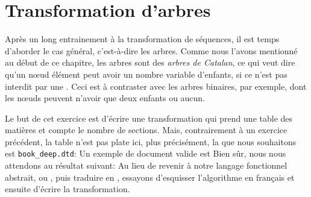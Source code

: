 \section{Transformation d'arbres}

Après un long entrainement à la transformation de séquences, il est
temps d'aborder le cas général, c'est-à-dire les arbres. Comme nous
l'avons mentionné au début de ce chapitre, les arbres \XML sont des
\emph{arbres de Catalan}, ce qui veut dire qu'un n{\oe}ud élément peut
avoir un nombre variable d'enfants, si ce n'est pas interdit par une
\DTD. Ceci est à contraster avec les arbres binaires, par exemple,
dont les n{\oe}uds peuvent n'avoir que deux enfants ou aucun.


Le but de cet exercice est d'écrire une transformation \XSLT qui prend
une table des matières et compte le nombre de sections. Mais,
contrairement à un exercice précédent, la table n'est pas plate ici,
plus précisément, la \DTD que nous souhaitons est \texttt{book\_deep.dtd}:
\noindent Un exemple de document \XML valide est
\noindent Bien sûr, nous nous attendons au résultat suivant:
{\small}
Au lieu de revenir à notre langage fonctionnel abstrait, ou \Erlang,
puis traduire en \XSLT, essayons d'esquisser l'algorithme en français
et ensuite d'écrire la transformation.

